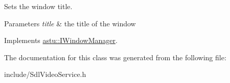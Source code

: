 Sets the window title.


\begin{DoxyParams}{Parameters}
{\em title} & the title of the window \\
\hline
\end{DoxyParams}


Implements \hyperlink{classastu_1_1IWindowManager_ae75ef0ce5ff6943712b9aa55cbfaadf8}{astu\+::\+I\+Window\+Manager}.



The documentation for this class was generated from the following file\+:\begin{DoxyCompactItemize}
\item 
include/Sdl\+Video\+Service.\+h\end{DoxyCompactItemize}
